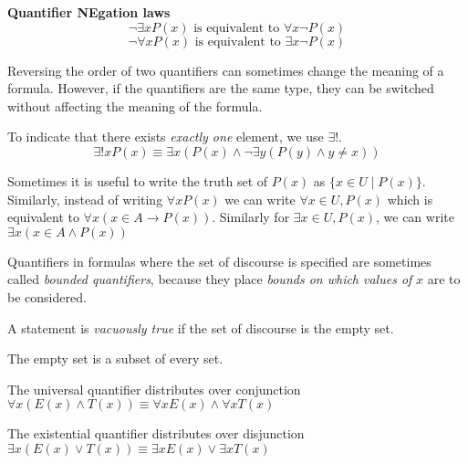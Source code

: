 \textbf{Quantifier NEgation laws}
\[\lnot \exists x P(x) \text{ is equivalent to } \forall x \lnot P(x)\]
\[\lnot \forall x P(x) \text{ is equivalent to } \exists x \lnot P(x)\]

Reversing the order of two quantifiers can sometimes change the meaning of a formula. However, if the quantifiers are the same type, they can be switched without affecting the meaning of the formula.

To indicate that there exists \textit{exactly one} element, we use $\exists!$.
\[\exists! x P(x) \equiv \exists x (P(x) \land \lnot \exists y (P(y) \land y \neq x))\]

Sometimes it is useful to write the truth set of $P(x)$ as $\{x \in U \mid P(x)\}$. Similarly, instead of writing $\forall x P(x)$ we can write $\forall x \in U, P(x)$ which is equivalent to $\forall x (x\in A \rightarrow P(x))$. Similarly for $\exists x \in U, P(x)$, we can write $\exists x (x \in A \land P(x))$

Quantifiers in formulas where the set of discourse is specified are sometimes called \textit{bounded quantifiers}, because they place \textit{bounds on which values of} $x$ are to be considered.

A statement is \textit{vacuously true} if the set of discourse is the empty set.

The empty set is a subset of every set.

The universal quantifier distributes over conjunction \(\forall x (E(x) \land T(x)) \equiv \forall x E(x) \land \forall x T(x)\)

The existential quantifier distributes over disjunction \(\exists x (E(x) \lor T(x)) \equiv \exists x E(x) \lor \exists x T(x)\)